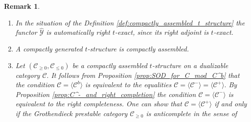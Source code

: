 \documentclass[11pt,leqno]{amsart}
\newtheorem{prop}[theo]{Proposition}
\newtheorem{remark}[theo]{Remark}
\numberwithin{equation}{section}
\newcommand{\cC}{{\mathcal C}}
\newcommand{\cY}{{\mathcal Y}}
\newcommand{\la}{\langle}
\newcommand{\ra}{\rangle}
\newcommand{\Ind}{\operatorname{Ind}}
\begin{document}
\begin{remark}\label{rem:comp_ass_t_structures}
\begin{enumerate}[label=(\roman*),ref=(\roman*)]
	\item In the situation of the Definition \ref{def:compactly_assembled_t_structure} the functor $\hat{\cY}$ is automatically right $t$-exact, since its right adjoint is $t$-exact.
	\item A compactly generated $t$-structure is compactly assembled.
	\item Let $(\cC_{\geq 0},\cC_{\leq 0})$ be a compactly assembled $t$-structure on a dualizable category $\cC.$ It follows from Proposition \ref{prop:SOD_for_C_mod_C^b} that the condition $\cC=\la \cC^b\ra$ is equivalent to the equalities $\cC=\la\cC^-\ra=\la\cC^+\ra.$ By Proposition \ref{prop:C^-_and_right_completion} the condition $\cC=\la\cC^-\ra$ is equivalent to the right completeness. One can show that $\cC=\la \cC^+\ra$ if and only if the Grothendieck prestable category $\cC_{\geq 0}$ is anticomplete in the sense of \cite[Definition C.5.5.4]{Lur18}
\end{enumerate}
\end{remark}



\end{document}
